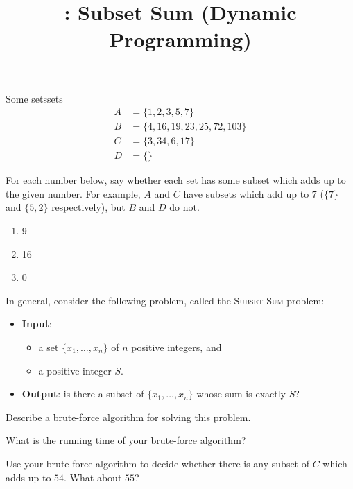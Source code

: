 \documentclass{tufte-handout}
\title{\thecourse: Subset Sum (Dynamic Programming)}
\date{}
\begin{document}
\maketitle

\begin{model*}{Some sets}{sets}
  \begin{align*}
    A &= \{ 1, 2, 3, 5, 7 \} \\
    B &= \{ 4, 16, 19, 23, 25, 72, 103 \} \\
    C &= \{ 3, 34, 6, 17 \} \\
    D &= \{ \}
  \end{align*}
\end{model*}

\begin{questions}
\item For each number below, say whether each set has some subset
  which adds up to the given number.  For example, $A$ and $C$ have
  subsets which add up to $7$ ($\{7\}$ and $\{5,2\}$ respectively),
  but $B$ and $D$ do not.
  \begin{enumerate}[label=(\alph*)]
  \item 9
  \item 16
  \item 0
  \end{enumerate}
\end{questions}

In general, consider the following problem, called the \textsc{Subset Sum}
problem:
\begin{itemize}
\item \textbf{Input}:
  \begin{itemize}
  \item a set $\{x_1, \dots, x_n\}$ of $n$ positive
    integers, and
  \item a positive integer $S$.
  \end{itemize}

\item \textbf{Output}: is there a subset of $\{x_1, \dots, x_n\}$
  whose sum is exactly $S$?
\end{itemize}

\begin{questions}
\item Describe a brute-force algorithm for solving this problem.
\item \label{q:brute} What is the running time of your brute-force
  algorithm? 
\item Use your brute-force algorithm to decide whether there is any
  subset of $C$ which adds up to $54$.  What about $55$?
\end{questions}
\end{document}
